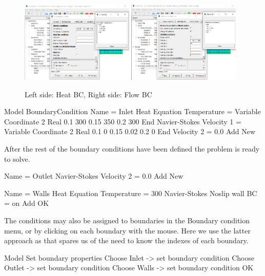 \begin{figure}[H]
\centering
\includegraphics[width=0.48\textwidth]{bc-heat}
\includegraphics[width=0.48\textwidth]{bc-flow}
\caption{Left side: Heat BC, Right side: Flow BC}\label{fg:bc}
\end{figure}  

\newpage

\ttbegin
Model
  BoundaryCondition
    Name = Inlet
    Heat Equation
      Temperature = Variable Coordinate 2
         Real 
           0.1    300
           0.15   350
           0.2    300
        End
    Navier-Stokes 
      Velocity 1 = Variable Coordinate 2
           Real 
             0.1    0
            0.15   0.02
            0.2    0
         End
      Velocity 2 = 0.0
    Add
    New
\ttend

After the rest of the boundary conditions have been defined the problem is ready to solve.

\ttbegin
    Name = Outlet
    Navier-Stokes 
      Velocity 2 = 0.0
    Add 
    New
 
    Name = Walls
    Heat Equation
       Temperature = 300
    Navier-Stokes 
      Noslip wall BC = on
    Add
    OK
\ttend   

The conditions may also be assigned to boundaries in the Boundary condition menu, or by clicking on each boundary with the mouse. Here we use the latter approach as that spares us of the need to know the indexes of each boundary.

\ttbegin
Model
  Set boundary properties
    Choose Inlet -> set boundary condition
    Choose Outlet -> set boundary condition
    Choose Walls -> set boundary condition
   OK 
\ttend


